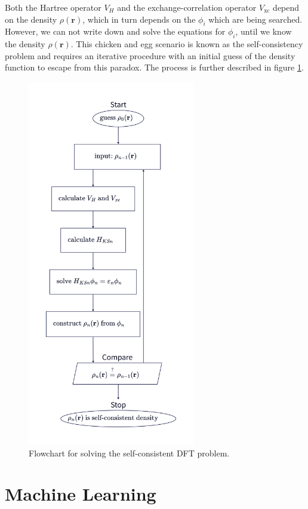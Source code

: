 Both the Hartree operator $V_H$ and the exchange-correlation operator
$V_\mathrm{xc}$
depend on the density $\rho(\mathbf{r})$, which in turn depends on the
$\phi_i$ which are being searched. However, we can not write down and solve
the equations for $\phi_i$, until we know the density $\rho(\mathbf{r})$. This
chicken and egg scenario is known as the self-consistency problem and requires
an iterative procedure with an initial guess of the density function to escape
from this paradox. The process is further described in figure
\ref{fig:self-consistency}.

\begin{figure}
  \begin{center}
    \includegraphics[width=7.3cm]{asset/self_consistency}
  \end{center}
  \caption{Flowchart for solving the self-consistent DFT problem.}
  \label{fig:self-consistency}
\end{figure}

\section{Machine Learning}

